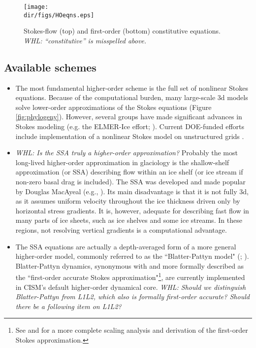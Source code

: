 \begin{figure}
  \begin{center}
    \texttt{[image: \\dir/figs/HOeqns.eps]}
   \end{center}
  \caption{Stokes-flow (top) and first-order (bottom) constitutive equations. \textit{WHL: ``constitutive'' is misspelled above.}}
  \label{fig:hoeqns}
\end{figure} 

\subsection{Available schemes}

\begin{itemize}
\item The most fundamental higher-order scheme is the full set of nonlinear Stokes equations. Because of the computational burden, many large-scale 3d models solve lower-order approximations of the Stokes equations (Figure \ref{fig:phylogeny}). However, several groups have made significant advances in Stokes modeling
(e.g. the ELMER-Ice effort; \citet{gagliardini:2013iv}). 
Current DOE-funded efforts include implementation of a nonlinear Stokes model on unstructured grids \citep{Leng:2012ia}.
\end{itemize}

\begin{itemize}
\item \textit{WHL: Is the SSA truly a higher-order approximation?}
Probably the most long-lived higher-order approximation in glaciology is the shallow-shelf approximation (or SSA) describing flow within an ice shelf (or ice stream if non-zero basal drag is included). The SSA was developed and made popular by Douglas MacAyeal (e.g., \citet{Macayeal:1989uo}). 
Its main disadvantage is that it is not fully 3d, as it assumes uniform velocity throughout the ice thickness driven only by horizontal stress gradients. It is, however, adequate for describing fast flow in many parts of ice sheets, such as ice shelves and some ice streams. In these regions, not resolving vertical gradients is a computational advantage.   
\end{itemize}

\begin{itemize}
\item The SSA equations are actually a depth-averaged form of a more general higher-order model, commonly referred to as the ``Blatter-Pattyn model" (\citet{BLATTER:1995wz}; \citet{Pattyn:2003tj}). 
Blatter-Pattyn dynamics, synonymous with and more formally described as the ``first-order accurate Stokes approximation"\footnote{See \citet{Schoof:2010dl} and \citet{DUKOWICZ:2010wb} for a more complete scaling analysis and derivation of the first-order Stokes approximation.}, are currently implemented in CISM's default higher-order dynamical core.
\textit{WHL: Should we distinguish Blatter-Pattyn from L1L2, which also is formally first-order accurate? Should there be a following item on L1L2?}
\end{itemize}


